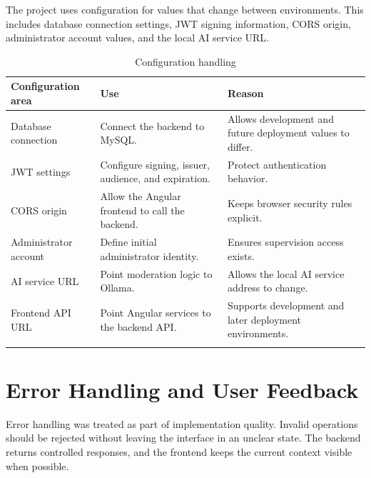 The project uses configuration for values that change between environments. This includes database connection settings, JWT signing information, CORS origin, administrator account values, and the local AI service URL.

\begin{longtable}{|m{3.6cm}|m{5.4cm}|m{5.2cm}|}
\hline
\textbf{Configuration area} & \textbf{Use} & \textbf{Reason} \\
\hline
Database connection & Connect the backend to MySQL. & Allows development and future deployment values to differ. \\
\hline
JWT settings & Configure signing, issuer, audience, and expiration. & Protect authentication behavior. \\
\hline
CORS origin & Allow the Angular frontend to call the backend. & Keeps browser security rules explicit. \\
\hline
Administrator account & Define initial administrator identity. & Ensures supervision access exists. \\
\hline
AI service URL & Point moderation logic to Ollama. & Allows the local AI service address to change. \\
\hline
Frontend API URL & Point Angular services to the backend API. & Supports development and later deployment environments. \\
\hline
\caption{Configuration handling}
\end{longtable}

\section{Error Handling and User Feedback}

Error handling was treated as part of implementation quality. Invalid operations should be rejected without leaving the interface in an unclear state. The backend returns controlled responses, and the frontend keeps the current context visible when possible.

